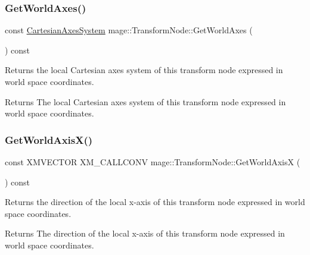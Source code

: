 \subsubsection{\texorpdfstring{Get\+World\+Axes()}{GetWorldAxes()}}
{\footnotesize\ttfamily const \hyperlink{structmage_1_1_cartesian_axes_system}{Cartesian\+Axes\+System} mage\+::\+Transform\+Node\+::\+Get\+World\+Axes (\begin{DoxyParamCaption}{ }\end{DoxyParamCaption}) const\hspace{0.3cm}{\ttfamily [noexcept]}}

Returns the local Cartesian axes system of this transform node expressed in world space coordinates.

\begin{DoxyReturn}{Returns}
The local Cartesian axes system of this transform node expressed in world space coordinates. 
\end{DoxyReturn}
\hypertarget{classmage_1_1_transform_node_a590d0ea24f6d0a9a29f14feda4184750}{}\label{classmage_1_1_transform_node_a590d0ea24f6d0a9a29f14feda4184750} 
\subsubsection{\texorpdfstring{Get\+World\+Axis\+X()}{GetWorldAxisX()}}
{\footnotesize\ttfamily const X\+M\+V\+E\+C\+T\+OR X\+M\+\_\+\+C\+A\+L\+L\+C\+O\+NV mage\+::\+Transform\+Node\+::\+Get\+World\+AxisX (\begin{DoxyParamCaption}{ }\end{DoxyParamCaption}) const\hspace{0.3cm}{\ttfamily [noexcept]}}

Returns the direction of the local x-\/axis of this transform node expressed in world space coordinates.

\begin{DoxyReturn}{Returns}
The direction of the local x-\/axis of this transform node expressed in world space coordinates. 
\end{DoxyReturn}
\hypertarget{classmage_1_1_transform_node_ad33e6a97ec9e1b484fcf87444c80c740}{}\label{classmage_1_1_transform_node_ad33e6a97ec9e1b484fcf87444c80c740} 
